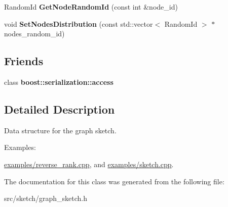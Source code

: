 \begin{DoxyCompactItemize}
\item 
\hypertarget{classall__distance__sketch_1_1GraphSketch_af9bbe3a02d29880b7218c52b53375e31}{}Random\+Id {\bfseries Get\+Node\+Random\+Id} (const int \&node\+\_\+id)\label{classall__distance__sketch_1_1GraphSketch_af9bbe3a02d29880b7218c52b53375e31}

\item 
\hypertarget{classall__distance__sketch_1_1GraphSketch_af57117f7a70b714dedc882d8f213207c}{}void {\bfseries Set\+Nodes\+Distribution} (const std\+::vector$<$ Random\+Id $>$ $\ast$nodes\+\_\+random\+\_\+id)\label{classall__distance__sketch_1_1GraphSketch_af57117f7a70b714dedc882d8f213207c}

\end{DoxyCompactItemize}
\subsection*{Friends}
\begin{DoxyCompactItemize}
\item 
\hypertarget{classall__distance__sketch_1_1GraphSketch_ac98d07dd8f7b70e16ccb9a01abf56b9c}{}class {\bfseries boost\+::serialization\+::access}\label{classall__distance__sketch_1_1GraphSketch_ac98d07dd8f7b70e16ccb9a01abf56b9c}

\end{DoxyCompactItemize}


\subsection{Detailed Description}
Data structure for the graph sketch. \begin{Desc}
\item[Examples\+: ]\par
\hyperlink{examples_2reverse_rank_8cpp-example}{examples/reverse\+\_\+rank.\+cpp}, and \hyperlink{examples_2sketch_8cpp-example}{examples/sketch.\+cpp}.\end{Desc}


The documentation for this class was generated from the following file\+:\begin{DoxyCompactItemize}
\item 
src/sketch/graph\+\_\+sketch.\+h\end{DoxyCompactItemize}
